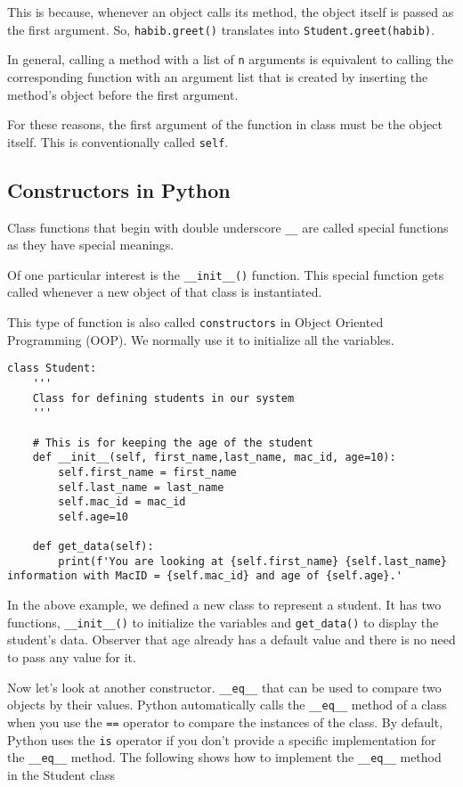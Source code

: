 \documentclass[11pt]{article}
\begin{document}
This is because, whenever an object calls its method, the object itself is
passed as the first argument. So, \texttt{habib.greet()} translates into
\texttt{Student.greet(habib)}.

In general, calling a method with a list of \texttt{n} arguments is equivalent to calling
the corresponding function with an argument list that is created by inserting
the method's object before the first argument.

For these reasons, the first argument of the function in class must be the
object itself. This is conventionally called \texttt{self}.

\subsection{Constructors in Python}
\label{sec:org68e3e4e}

Class functions that begin with double underscore \texttt{\_\_} are called special
functions as they have special meanings.

Of one particular interest is the \texttt{\_\_init\_\_()} function. This special function
gets called whenever a new object of that class is instantiated.

This type of function is also called \texttt{constructors} in Object Oriented Programming
(OOP). We normally use it to initialize all the variables.

\begin{verbatim}
class Student:
    '''
    Class for defining students in our system
    '''

    # This is for keeping the age of the student
    def __init__(self, first_name,last_name, mac_id, age=10):
        self.first_name = first_name
        self.last_name = last_name
        self.mac_id = mac_id
        self.age=10

    def get_data(self):
        print(f'You are looking at {self.first_name} {self.last_name} information with MacID = {self.mac_id} and age of {self.age}.'
\end{verbatim}


In the above example, we defined a new class to represent a student. It has two
functions, \texttt{\_\_init\_\_()} to initialize the variables and \texttt{get\_data()} to display the
student's data. Observer that age already has a default value and there is no
need to pass any value for it.


Now let's look at another constructor. \texttt{\_\_eq\_\_} that can be used to compare two
objects by their values. Python automatically calls the \texttt{\_\_eq\_\_} method of a
class when you use the \texttt{==} operator to compare the instances of the class. By
default, Python uses the \texttt{is} operator if you don’t provide a specific
implementation for the \texttt{\_\_eq\_\_} method. The following shows how to implement the
\texttt{\_\_eq\_\_} method in the Student class
\end{document}
